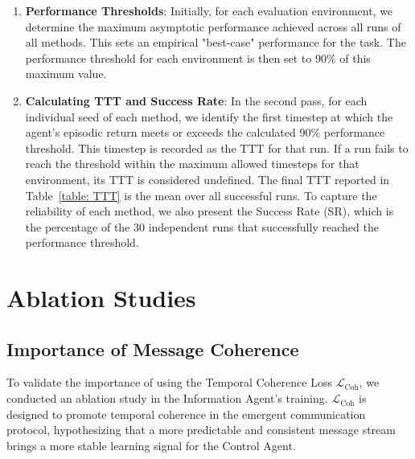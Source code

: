 \documentclass[letterpaper]{article} %
\begin{document}
\begin{appendix}
\begin{enumerate}
    \item \textbf{Performance Thresholds}: Initially, for each evaluation environment, we determine the maximum asymptotic performance achieved across all runs of all methods. This sets an empirical "best-case" performance for the task. The performance threshold for each environment is then set to 90\% of this maximum value. 
    \item \textbf{Calculating TTT and Success Rate}: In the second pass, for each individual seed of each method, we identify the first timestep at which the agent's episodic return meets or exceeds the calculated 90\% performance threshold. This timestep is recorded as the TTT for that run. If a run fails to reach the threshold within the maximum allowed timesteps for that environment, its TTT is considered undefined. The final TTT reported in Table~\ref{table: TTT} is the mean over all successful runs. To capture the reliability of each method, we also present the Success Rate (SR), which is the percentage of the 30 independent runs that successfully reached the performance threshold.
\end{enumerate}

\onecolumn
\section{Ablation Studies}
\subsection{Importance of Message Coherence}

To validate the importance of using the Temporal Coherence Loss $\mathcal{L}_{\text{Coh}}$, we conducted an ablation study in the Information Agent's training. $\mathcal{L}_{\text{Coh}}$ is designed to promote temporal coherence in the emergent communication protocol, hypothesizing that a more predictable and consistent message stream brings a more stable learning signal for the Control Agent.


\end{appendix}
\end{document}
